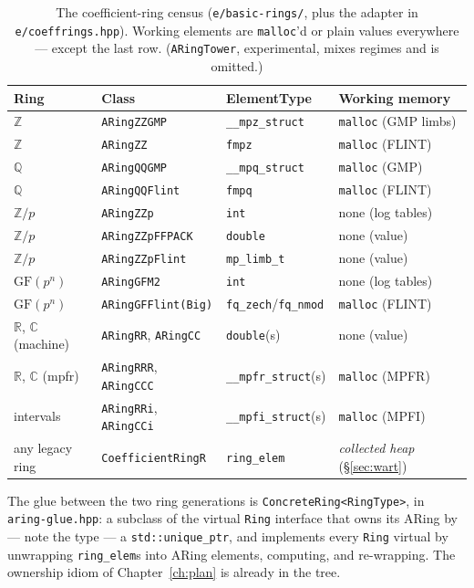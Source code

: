 \documentclass[11pt,oneside]{report}
\newcommand{\code}[1]{\textcolor{m2code}{\texttt{#1}}}
\newcommand{\file}[1]{\textcolor{m2file}{\texttt{#1}}}
\begin{document}
\begin{table}[htbp]
\centering\small
{}
\begin{tabular}{@{}llll@{}}
\toprule
\textbf{Ring} & \textbf{Class} & \textbf{ElementType} & \textbf{Working memory} \\
\midrule
$\mathbb{Z}$ & \code{ARingZZGMP} & \code{\_\_mpz\_struct} & \code{malloc} (GMP limbs) \\
$\mathbb{Z}$ & \code{ARingZZ} & \code{fmpz} & \code{malloc} (FLINT) \\
$\mathbb{Q}$ & \code{ARingQQGMP} & \code{\_\_mpq\_struct} & \code{malloc} (GMP) \\
$\mathbb{Q}$ & \code{ARingQQFlint} & \code{fmpq} & \code{malloc} (FLINT) \\
$\mathbb{Z}/p$ & \code{ARingZZp} & \code{int} & none (log tables) \\
$\mathbb{Z}/p$ & \code{ARingZZpFFPACK} & \code{double} & none (value) \\
$\mathbb{Z}/p$ & \code{ARingZZpFlint} & \code{mp\_limb\_t} & none (value) \\
$\mathrm{GF}(p^n)$ & \code{ARingGFM2} & \code{int} & none (log tables) \\
$\mathrm{GF}(p^n)$ & \code{ARingGFFlint(Big)} & \code{fq\_zech}/\code{fq\_nmod} & \code{malloc} (FLINT) \\
$\mathbb{R}$, $\mathbb{C}$ (machine) & \code{ARingRR}, \code{ARingCC} & \code{double}(s) & none (value) \\
$\mathbb{R}$, $\mathbb{C}$ (mpfr) & \code{ARingRRR}, \code{ARingCCC} & \code{\_\_mpfr\_struct}(s) & \code{malloc} (MPFR) \\
intervals & \code{ARingRRi}, \code{ARingCCi} & \code{\_\_mpfi\_struct}(s) & \code{malloc} (MPFI) \\
any legacy ring & \code{CoefficientRingR} & \code{ring\_elem} & \emph{collected heap} (\S\ref{sec:wart}) \\
\bottomrule
\end{tabular}
\caption{The coefficient-ring census (\file{e/basic-rings/}, plus the
adapter in \file{e/coeffrings.hpp}). Working elements are \code{malloc}'d
or plain values everywhere --- except the last row.
(\code{ARingTower}, experimental, mixes regimes and is omitted.)}
\label{tab:arings}
\end{table}

The glue between the two ring generations is
\code{ConcreteRing<RingType>}, in \file{aring-glue.hpp}: a subclass of the
virtual \code{Ring} interface that owns its ARing by --- note the type ---
a \code{std::unique\_ptr}, and implements every \code{Ring} virtual by
unwrapping \code{ring\_elem}s into ARing elements, computing, and
re-wrapping. The ownership idiom of Chapter~\ref{ch:plan} is already in
the tree.
\end{document}
